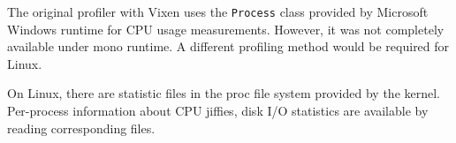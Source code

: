 The original profiler with Vixen uses the \texttt{Process} class provided by Microsoft Windows runtime for CPU usage measurements. However, it was not completely available under mono runtime. A different profiling method would be required for Linux.

On Linux, there are statistic files in the proc file system \cite{proc} provided by the kernel. Per-process information about CPU jiffies, disk I/O statistics are available by reading corresponding files.
